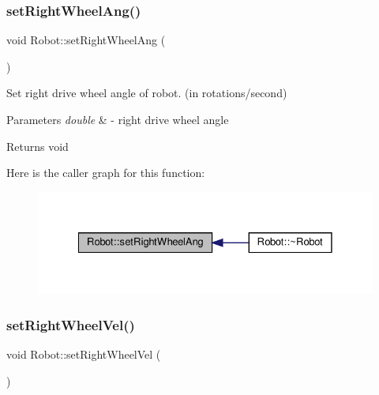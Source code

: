 \subsubsection{\texorpdfstring{set\+Right\+Wheel\+Ang()}{setRightWheelAng()}}
{\footnotesize\ttfamily void Robot\+::set\+Right\+Wheel\+Ang (\begin{DoxyParamCaption}\item[{double}]{ }\end{DoxyParamCaption})}



Set right drive wheel angle of robot. (in rotations/second) 


\begin{DoxyParams}{Parameters}
{\em double} & -\/ right drive wheel angle \\
\hline
\end{DoxyParams}
\begin{DoxyReturn}{Returns}
void 
\end{DoxyReturn}
Here is the caller graph for this function\+:
\nopagebreak
\begin{figure}[H]
\begin{center}
\leavevmode
\includegraphics[width=328pt]{classRobot_a3d7a12ec4cd50436d46363de93a4f9b2_icgraph}
\end{center}
\end{figure}
\mbox{\label{classRobot_a89e3ada15839330f45c350b67ba746f3}} 
\subsubsection{\texorpdfstring{set\+Right\+Wheel\+Vel()}{setRightWheelVel()}}
{\footnotesize\ttfamily void Robot\+::set\+Right\+Wheel\+Vel (\begin{DoxyParamCaption}\item[{double}]{ }\end{DoxyParamCaption})}



